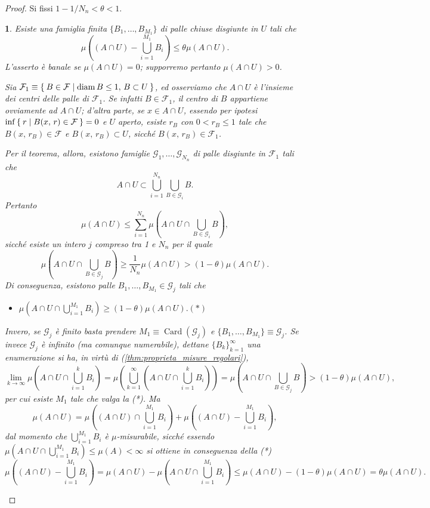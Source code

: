 \documentclass[a4paper,10pt,openright,oneside]{book}
\theoremstyle{theoremstyle}
\theoremstyle{theoremstylewoheader}
\theoremstyle{theoremstyle}
\theoremstyle{proofsecstyle}
\newtheorem{proofsec}{}
\theoremstyle{nonumberplain}
\newtheorem{proof}{Dim.}
\newcommand{\FF}{\ensuremath{\mathcal{F}}}
\newcommand{\GG}{\ensuremath{\mathcal{G}}}
\DeclareMathOperator{\diam}{diam}
\DeclareMathOperator{\Card}{Card}
\newcommand{\mymath}[2]{\begin{itemize}%
  \item[]\hfill\hbox{}\ensuremath{\displaystyle #1}\hfill\ensuremath{\displaystyle #2}%
  \end{itemize}}
\begin{document}
\begin{proof}
Si fissi $1 - 1/N_n < \theta < 1$.

\begin{proofsec}
\emph{Esiste una famiglia finita $\{B_1, \ldots, B_{M_1}\}$ di palle chiuse disgiunte in $U$ tali che}
\[
\mu\left((A \cap U) - \bigcup_{i=1}^{M_1} B_i\right) \le \theta\mu(A \cap U).
\]
L'asserto è banale se $\mu(A \cap U) = 0$; supporremo pertanto $\mu(A \cap U) > 0$.

Sia $\FF_1 \equiv \Set{ B \in \FF | \diam B \le 1,\, B \subset U }$, ed osserviamo che $A \cap U$ è l'insieme dei centri delle palle di $\FF_1$. Se infatti $B \in \FF_1$, il centro di $B$ appartiene ovviamente ad $A \cap U$; d'altra parte, se $x \in A \cap U$, essendo per ipotesi $\inf\Set{ r | B(x,\, r) \in \FF } = 0$ e $U$ aperto, esiste $r_B$ con $0 < r_B \le 1$ tale che $B(x,\, r_B) \in \FF$ e $B(x,\, r_B) \subset U$, sicché $B(x,\, r_B) \in \FF_1$.

Per il teorema, allora, esistono famiglie $\GG_1, \ldots, \GG_{N_n}$ di palle disgiunte in $\FF_1$ tali che
\[
A \cap U \subset \bigcup_{i=1}^{N_n} \bigcup_{B \in \GG_i} B.
\]
Pertanto
\[
\mu(A \cap U) \le \sum_{i=1}^{N_n} \mu\left(A \cap U \cap \bigcup_{B \in \GG_i} B\right),
\]
sicché esiste un intero $j$ compreso tra 1 e $N_n$ per il quale
\[
\mu\left(A \cap U \cap \bigcup_{B \in \GG_j} B\right) \ge \frac{1}{N_n} \mu(A \cap U) > (1-\theta)\mu(A \cap U).
\]
Di conseguenza, esistono palle $B_1, \ldots, B_{M_1} \in \GG_j$ tali che \mymath{\mu\left(A \cap U \cap \bigcup_{i=1}^{M_1} B_i\right) \ge (1 - \theta)\mu(A \cap U).}{(*)} Invero, se $\GG_j$ è finito basta prendere $M_1 \equiv \Card(\GG_j)$ e $\{B_1, \ldots, B_{M_1}\} \equiv \GG_j$. Se invece $\GG_j$ è infinito (ma comunque numerabile), dettane $\{B_k\}_{k=1}^\infty$ una enumerazione si ha, in virtù di (\ref{thm:proprieta_misure_regolari}),
\[
\lim_{k \to \infty} \mu\left(A \cap U \cap \bigcup_{i=1}^k B_i\right) = \mu\left(\bigcup_{k=1}^\infty \left(A \cap U \cap \bigcup_{i=1}^k B_i\right)\right) = \mu\left(A \cap U \cap \bigcup_{B \in \GG_j} B\right) > (1-\theta)\mu(A \cap U),
\]
per cui esiste $M_1$ tale che valga la (*). Ma
\[
\mu(A \cap U) = \mu\left((A \cap U) \cap \bigcup_{i=1}^{M_1} B_i\right) + \mu\left((A \cap U) - \bigcup_{i=1}^{M_1} B_i\right),
\]
dal momento che $\bigcup_{i=1}^{M_1} B_i$ è $\mu$-misurabile, sicché essendo $\mu\left(A \cap U \cap \bigcup_{i=1}^{M_1} B_i\right) \le \mu(A) < \infty$ si ottiene in conseguenza della (*)
\[
\mu\left((A \cap U) - \bigcup_{i=1}^{M_1} B_i\right) = \mu(A \cap U) - \mu\left(A \cap U \cap \bigcup_{i=1}^{M_1} B_i\right) \le \mu(A \cap U) - (1-\theta)\mu(A \cap U) = \theta\mu(A \cap U).
\]
\end{proofsec}


\end{proof}
\end{document}
